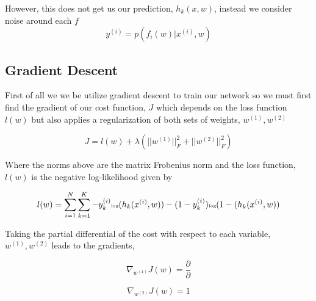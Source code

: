 \documentclass[12pt, twocolumn]{article}
\begin{document}
However, this does not get us our prediction, $h_k(x,w)$, instead we consider noise around each $f$
\begin{equation}
y^{(i)}= p(f_i(w) | x^{(i)},w)
\end{equation}


\subsection{Gradient Descent}
First of all we we be utilize gradient descent to train our network so  we must first find the gradient of our cost function, $J$ which depends on the loss function $l(w)$ but also applies a regularization of both sets of weights, $w^{(1)}, w^{(2)}$

\begin{equation}
J= l(w) + \lambda ( ||w^{(1)}||^2_F +||w^{(2)}||^2_F)
\end{equation}

Where the norms above are the matrix Frobenius norm and the loss function, $l(w)$ is the  negative log-likelihood given by 

\begin{equation}
\tiny
l(w)= \sum_{i=1}^N \sum_{k=1}^K -y^{(i)}_k \textrm{log}(h_k(x^{(i)}, w)) - (1 -y^{(i)}_k) \textrm{log}(1 -(h_k(x^{(i)}, w))
\end {equation}


Taking the partial differential of the cost with respect to each variable, $w^{(1)},w^{(2)}$ leads to the gradients, 

\begin{equation}
\nabla_{w^{(1)}} J (w)= \frac{\partial }{\partial} 
\end{equation}

\begin{equation}
\nabla_{w^{(2)}} J (w)= 1
\end{equation} 

 
\end{document}
